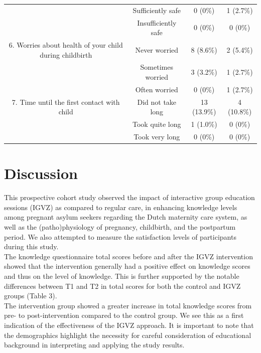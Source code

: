 \documentclass[12pt]{article}
\begin{document}
\begin{landscape}
\begin{table}[htbp]
\begin{threeparttable}
\begin{tabular}{cccc}
             & Sufficiently safe  & 0 (0\%) & 1 (2.7\%) \\ 
             & Insufficiently safe   & 0 (0\%) & 0 (0\%) \\ 
            \midrule
            6. Worries about health of your child during childbirth & Never worried  & 8 (8.6\%) & 2 (5.4\%) \\ 
             & Sometimes worried  & 3 (3.2\%)  & 1 (2.7\%) \\ 
             & Often worried   & 0 (0\%)  & 1 (2.7\%) \\ 
            \midrule
            7. Time until the first contact with child & Did not take long   & 13 (13.9\%) & 4 (10.8\%) \\ 
             & Took quite long  & 1 (1.0\%) & 0 (0\%) \\ 
             & Took very long  & 0 (0\%) & 0 (0\%) \\ 
            \bottomrule
        \end{tabular}
    \end{threeparttable}
\end{table}
\end{landscape}

\section{Discussion}

\noindent This prospective cohort study observed the impact of interactive group education sessions (IGVZ) as compared to regular care, in enhancing knowledge levels among pregnant asylum seekers regarding the Dutch maternity care system, as well as the (patho)physiology of pregnancy, childbirth, and the postpartum period. We also attempted to measure the satisfaction levels of participants during this study. \\

\noindent The knowledge questionnaire total scores before and after the IGVZ intervention showed that the intervention generally had a positive effect on knowledge scores and thus on the level of knowledge. This is further supported by the notable differences between T1 and T2 in total scores for both the control and IGVZ groups (Table 3). \\

\noindent The intervention group showed a greater increase in total knowledge scores from pre- to post-intervention compared to the control group. We see this as a first indication of the effectiveness of the IGVZ approach. It is important to note that the demographics highlight the necessity for careful consideration of educational background in interpreting and applying the study results. \\
\end{document}
